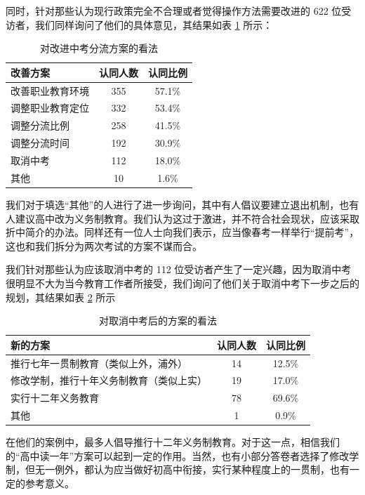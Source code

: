 \documentclass[12pt,UTF8]{ctexart}
\begin{document}
\par {
	同时，针对那些认为现行政策完全不合理或者觉得操作方法需要改进的 622 位受访者，我们同样询问了他们的具体意见，其结果如表 \ref{fig:3} 所示：
}
\begin{table}[htbp]
	\centering
	\caption{对改进中考分流方案的看法}
	\label{fig:3}
	\begin{tabular}{lcc}
		\hline
		\hline
		{\bf 改善方案} & {\bf 认同人数} & {\bf 认同比例}\\ \hline
		改善职业教育环境 & 355 & 57.1\% \\
		调整职业教育定位 & 332 & 53.4\% \\
		调整分流比例 & 258 & 41.5\% \\
		调整分流时间 & 192 & 30.9\% \\
		取消中考 & 112 & 18.0\% \\
		其他 & 10 & 1.6\% \\
		\hline
		\hline
	\end{tabular}
\end{table}
\par {
	
	我们对于填选“其他”的人进行了进一步询问，其中有人倡议要建立退出机制，也有人建议高中改为义务制教育。我们认为这过于激进，并不符合社会现状，应该采取折中简介的办法。同样还有一位人士向我们表示，应当像春考一样举行“提前考”，这也和我们拆分为两次考试的方案不谋而合。
}
\par {
	我们针对那些认为应该取消中考的 112
	位受访者产生了一定兴趣，因为取消中考很明显不大为当今教育工作者所接受，我们询问了他们关于取消中考下一步之后的规划，其结果如表 \ref{fig:4} 所示
}
\begin{table}[htbp]
	\centering
	\caption{对取消中考后的方案的看法}
	\label{fig:4}
	\begin{tabular}{lcc}
		\hline
		\hline
		{\bf 新的方案} & {\bf 认同人数} & {\bf 认同比例}\\ \hline
		推行七年一贯制教育（类似上外，浦外） & 14 & 12.5\% \\
		修改学制，推行十年义务制教育（类似上实） & 19 & 17.0\% \\
		实行十二年义务教育 & 78 & 69.6\% \\
		其他 & 1 & 0.9\% \\
		\hline
		\hline
	\end{tabular}
\end{table}
\par {
	
	在他们的案例中，最多人倡导推行十二年义务制教育。对于这一点，相信我们的“高中读一年”方案可以起到一定的作用。当然，也有小部分答卷者选择了修改学制，但无一例外，都认为应当做好初高中衔接，实行某种程度上的一贯制，也有一定的参考意义。
}
\end{document}
